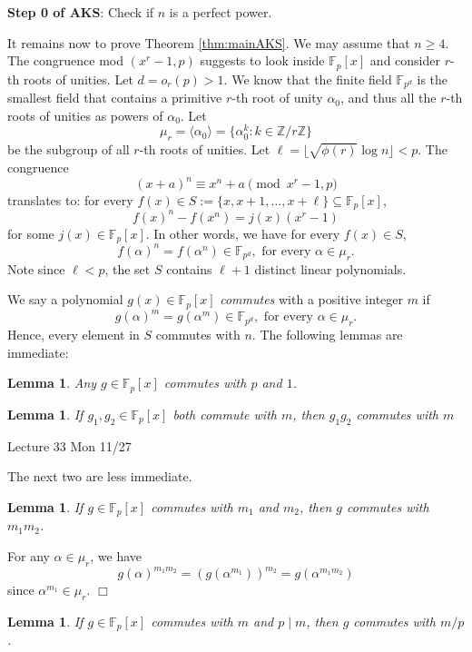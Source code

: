 \documentclass{article}
\def\Z{{\mathbb Z}}
\def\F{{\mathbb F}}
\def\Z{{\mathbb Z}}
\def\F{{\mathbb F}}
\newtheorem{lemma}[subsection]{Lemma}
\newenvironment{proof}{\noindent {\bf Proof:}}{$\Box$ \vspace{2 ex}}
\newcommand{\add}[1]{{\color{blue} #1}}
\begin{document}
\noindent\textbf{Step 0 of AKS}: Check if $n$ is a perfect power.


\vspace{5pt}
It remains now to prove Theorem \ref{thm:mainAKS}. We may assume that $n\geq 4$. The congruence mod $(x^r - 1,p)$ suggests to look inside $\F_p[x]$ and consider $r$-th roots of unities. Let $d = o_r(p) > 1$. We know that the finite field $\F_{p^d}$ is the smallest field that contains a primitive $r$-th root of unity $\alpha_0$, and thus all the $r$-th roots of unities as powers of $\alpha_0$. Let $$\mu_r = \langle \alpha_0\rangle = \{\alpha_0^k\colon k\in\Z/r\Z\}$$ be the subgroup of all $r$-th roots of unities. Let $\ell = \lfloor \sqrt{\phi(r)}\log n\rfloor < p$. The congruence $$(x + a)^n\equiv x^n + a\pmod{x^r -1, p}$$
translates to: for every $f(x) \in S :=\{x, x+1, \ldots, x+\ell\} \subseteq \F_p[x]$,
$$f(x)^n - f(x^n) = j(x)(x^r - 1)$$
for some $j(x)\in\F_p[x]$. In other words, we have for every $f(x)\in S$, $$f(\alpha)^n = f(\alpha^n) \in \F_{p^d},\mbox{ for every }\alpha\in\mu_r.$$
Note since $\ell < p$, the set $S$ contains $\ell+1$ distinct linear polynomials.

We say a polynomial $g(x)\in\F_p[x]$ \textit{commutes} with a positive integer $m$ if 
$$g(\alpha)^m = g(\alpha^m) \in \F_{p^d},\mbox{ for every }\alpha\in\mu_r.$$
Hence, every element in $S$ commutes with $n$. The following lemmas are immediate:
\begin{lemma}
    Any $g\in \F_p[x]$ commutes with $p$ and $1$.
\end{lemma}

\begin{lemma}
    If $g_1,g_2\in\F_p[x]$ both commute with $m$, then $g_1g_2$ commutes with $m$
\end{lemma}
\begin{center}
    \add{Lecture 33 Mon 11/27}
\end{center}
The next two are less immediate.
\begin{lemma}
    If $g\in\F_p[x]$ commutes with $m_1$ and $m_2$, then $g$ commutes with $m_1m_2$.
\end{lemma}

\begin{proof}
    For any $\alpha\in\mu_r$, we have
    $$g(\alpha)^{m_1m_2} = (g(\alpha^{m_1}))^{m_2} = g(\alpha^{m_1m_2})$$
    since $\alpha^{m_1}\in\mu_r$.
\end{proof}

\begin{lemma}
    If $g\in\F_p[x]$ commutes with $m$ and $p\mid m$, then $g$ commutes with $m/p$.
\end{lemma}
\end{document}
